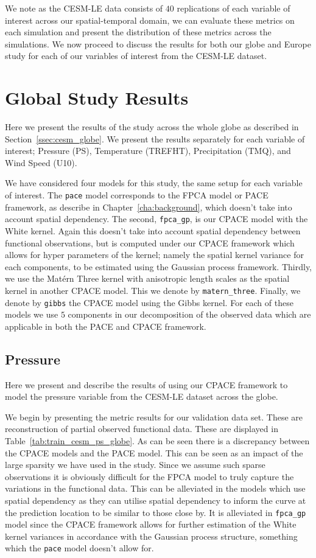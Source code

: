 We note as the CESM-LE data consists of $40$ replications of each variable of interest across our spatial-temporal domain, we can evaluate these metrics on each simulation and present the distribution of these metrics across the simulations.
We now proceed to discuss the results for both our globe and Europe study for each of our variables of interest from the CESM-LE dataset.

\section{Global Study Results \label{sec:cesm_res}}
Here we present the results of the study across the whole globe as described in Section~\ref{ssec:cesm_globe}.
We present the results separately for each variable of interest; Pressure (PS), Temperature (TREFHT), Precipitation (TMQ), and Wind Speed (U10).

We have considered four models for this study, the same setup for each variable of interest.
The \verb*|pace| model corresponds to the FPCA model or PACE framework, as describe in Chapter~\ref{cha:background},  which doesn't take into account spatial dependency.
The second, \verb*|fpca_gp|, is our CPACE model with the White kernel.
Again this doesn't take into account spatial dependency between functional observations, but is computed under our CPACE framework which allows for hyper parameters of the kernel; namely the spatial kernel variance for each components, to be estimated using the Gaussian process framework.
Thirdly, we use the Mat\'ern Three kernel with anisotropic length scales as the spatial kernel in another CPACE model.
This we denote by \verb*|matern_three|.
Finally, we denote by \verb*|gibbs| the CPACE model using the Gibbs kernel.
For each of these models we use $5$ components in our decomposition of the observed data which are applicable in both the PACE and CPACE framework. 

\subsection{Pressure\label{ssec:cesm_ps}}
Here we present and describe the results of using our CPACE framework to model the pressure variable from the CESM-LE dataset across the globe.

We begin by presenting the metric results for our validation data set.
These are reconstruction of partial observed functional data.
These are displayed in Table~\ref{tab:train_cesm_ps_globe}.
As can be seen there is a discrepancy between the CPACE models and the PACE model.
This can be seen as an impact of the large sparsity we have used in the study.
Since we assume such sparse observations it is obviously difficult for the FPCA model to truly capture the variations in the functional data.
This can be alleviated in the models which use spatial dependency as they can utilise spatial dependency to inform the curve at the prediction location to be similar to those close by.
It is alleviated in \verb*|fpca_gp| model since the CPACE framework allows for further estimation of the White kernel variances in accordance with the Gaussian process structure, something which the \verb*|pace| model doesn't allow for. 

